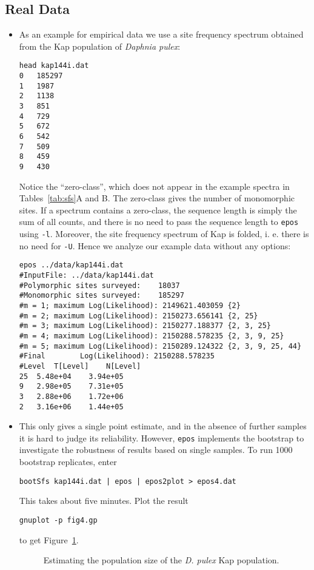 \documentclass[a4paper]{article}
\newcommand{\ty}{\texttt}
\begin{document}
\subsection{Real Data}
\begin{itemize}
\item As an example for empirical data we use a site frequency spectrum obtained from
  the Kap population of \textit{Daphnia pulex}:
\begin{verbatim}
head kap144i.dat 
0	185297
1	1987
2	1138
3	851
4	729
5	672
6	542
7	509
8	459
9	430
\end{verbatim}
Notice the ``zero-class'', which does not appear in the
example spectra in Tables~\ref{tab:sfs}A and B. The zero-class gives
the number of monomorphic sites. If a spectrum contains a zero-class,
the sequence length is simply the sum of all counts, and there is no need
to pass the sequence length to \ty{epos} using \ty{-l}. Moreover, the
site frequency spectrum of Kap is folded, i. e. there is no need for \ty{-U}. Hence
we analyze our example data without any options:
\begin{verbatim}
epos ../data/kap144i.dat 
#InputFile:	../data/kap144i.dat
#Polymorphic sites surveyed:	18037
#Monomorphic sites surveyed:	185297
#m = 1; maximum Log(Likelihood): 2149621.403059	{2}
#m = 2; maximum Log(Likelihood): 2150273.656141	{2, 25}
#m = 3; maximum Log(Likelihood): 2150277.188377	{2, 3, 25}
#m = 4; maximum Log(Likelihood): 2150288.578235	{2, 3, 9, 25}
#m = 5; maximum Log(Likelihood): 2150289.124322	{2, 3, 9, 25, 44}
#Final        Log(Likelihood): 2150288.578235
#Level	T[Level]	N[Level]
25	5.48e+04	3.94e+05
9	2.98e+05	7.31e+05
3	2.88e+06	1.72e+06
2	3.16e+06	1.44e+05
\end{verbatim}
\item This only gives a single point estimate, and in the absence of
  further samples it is hard to judge its reliability. However,
  \ty{epos} implements the bootstrap to investigate the robustness of
  results based on single samples. To run 1000 bootstrap replicates, enter
\begin{verbatim}
bootSfs kap144i.dat | epos | epos2plot > epos4.dat
\end{verbatim}
This takes about five minutes. Plot the result
\begin{verbatim}
gnuplot -p fig4.gp
\end{verbatim}
to get Figure~\ref{fig:kap}.
\begin{figure}
  \begin{center}
    \scalebox{0.6}{}
  \end{center}
  \caption{Estimating the population size of the \textit{D. pulex} Kap
    population.}\label{fig:kap}
\end{figure}
\end{itemize}
\end{document}
